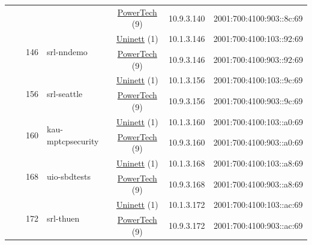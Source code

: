 \begin{small}
\begin{center}
\begin{longtable}{|c|c|c|c|c|c|c|c|}
  &  &  &  & \multicolumn{2}{|c|}{\tiny{\href{http://www.powertech.no}{PowerTech} (9)}} & \tiny{10.9.3.140} & \tiny{2001:700:4100:903::8c:69} \\* \cline{3-3}\cline{4-4}\cline{5-5}\cline{6-6}\cline{7-7}\cline{8-8}
  &  & \multirow{2}{*}{\tiny{146}} & \multicolumn{1}{|l|}{\multirow{2}{*}{\tiny{srl-nndemo}}} & \multicolumn{2}{|c|}{\tiny{\href{https://www.uninett.no}{Uninett} (1)}} & \tiny{10.1.3.146} & \tiny{2001:700:4100:103::92:69} \\* \cline{5-5}\cline{6-6}\cline{7-7}\cline{8-8}
  &  &  &  & \multicolumn{2}{|c|}{\tiny{\href{http://www.powertech.no}{PowerTech} (9)}} & \tiny{10.9.3.146} & \tiny{2001:700:4100:903::92:69} \\* \cline{3-3}\cline{4-4}\cline{5-5}\cline{6-6}\cline{7-7}\cline{8-8}
  &  & \multirow{2}{*}{\tiny{156}} & \multicolumn{1}{|l|}{\multirow{2}{*}{\tiny{srl-seattle}}} & \multicolumn{2}{|c|}{\tiny{\href{https://www.uninett.no}{Uninett} (1)}} & \tiny{10.1.3.156} & \tiny{2001:700:4100:103::9c:69} \\* \cline{5-5}\cline{6-6}\cline{7-7}\cline{8-8}
  &  &  &  & \multicolumn{2}{|c|}{\tiny{\href{http://www.powertech.no}{PowerTech} (9)}} & \tiny{10.9.3.156} & \tiny{2001:700:4100:903::9c:69} \\* \cline{3-3}\cline{4-4}\cline{5-5}\cline{6-6}\cline{7-7}\cline{8-8}
  &  & \multirow{2}{*}{\tiny{160}} & \multicolumn{1}{|l|}{\multirow{2}{*}{\tiny{kau-mptcpsecurity}}} & \multicolumn{2}{|c|}{\tiny{\href{https://www.uninett.no}{Uninett} (1)}} & \tiny{10.1.3.160} & \tiny{2001:700:4100:103::a0:69} \\* \cline{5-5}\cline{6-6}\cline{7-7}\cline{8-8}
  &  &  &  & \multicolumn{2}{|c|}{\tiny{\href{http://www.powertech.no}{PowerTech} (9)}} & \tiny{10.9.3.160} & \tiny{2001:700:4100:903::a0:69} \\* \cline{3-3}\cline{4-4}\cline{5-5}\cline{6-6}\cline{7-7}\cline{8-8}
  &  & \multirow{2}{*}{\tiny{168}} & \multicolumn{1}{|l|}{\multirow{2}{*}{\tiny{uio-sbdtests}}} & \multicolumn{2}{|c|}{\tiny{\href{https://www.uninett.no}{Uninett} (1)}} & \tiny{10.1.3.168} & \tiny{2001:700:4100:103::a8:69} \\* \cline{5-5}\cline{6-6}\cline{7-7}\cline{8-8}
  &  &  &  & \multicolumn{2}{|c|}{\tiny{\href{http://www.powertech.no}{PowerTech} (9)}} & \tiny{10.9.3.168} & \tiny{2001:700:4100:903::a8:69} \\* \cline{3-3}\cline{4-4}\cline{5-5}\cline{6-6}\cline{7-7}\cline{8-8}
  &  & \multirow{2}{*}{\tiny{172}} & \multicolumn{1}{|l|}{\multirow{2}{*}{\tiny{srl-thuen}}} & \multicolumn{2}{|c|}{\tiny{\href{https://www.uninett.no}{Uninett} (1)}} & \tiny{10.1.3.172} & \tiny{2001:700:4100:103::ac:69} \\* \cline{5-5}\cline{6-6}\cline{7-7}\cline{8-8}
  &  &  &  & \multicolumn{2}{|c|}{\tiny{\href{http://www.powertech.no}{PowerTech} (9)}} & \tiny{10.9.3.172} & \tiny{2001:700:4100:903::ac:69} \\ \hline
\end{longtable}
\end{center}
\end{small}
